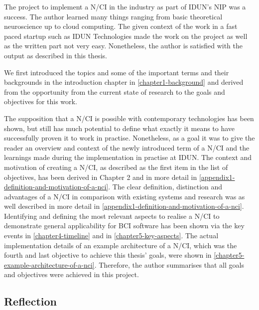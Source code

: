 The project to implement a N/CI in the industry as part of IDUN's NIP was a success. The author learned many things ranging from basic theoretical neuroscience up to cloud computing. The given context of the work in a fast paced startup such as IDUN Technologies made the work on the project as well as the written part not very easy. Nonetheless, the author is satisfied with the output as described in this thesis.

We first introduced the topics and some of the important terms and their backgrounds in the introduction chapter in \autoref{chapter1-background} and derived from the opportunity from the current state of research to the goals and objectives for this work.

The supposition that a N/CI is possible with contemporary technologies has been shown, but still has much potential to define what exactly it means to have successfully proven it to work in practise. Nonetheless, as a goal it was to give the reader an overview and context of the newly introduced term of a N/CI and the learnings made during the implementation in practise at IDUN. The context and motivation of creating a N/CI, as described as the first item in the list of objectives, has been derived in Chapter 2 and in more detail in \autoref{appendix1-definition-and-motivation-of-a-nci}. The clear definition, distinction and advantages of a N/CI in comparison with existing systems and research was as well described in more detail in \autoref{appendix1-definition-and-motivation-of-a-nci}. Identifying and defining the most relevant aspects to realise a N/CI to demonstrate general applicability for BCI software has been shown via the key events in \autoref{chapter4-timeline} and in \autoref{chapter5-key-aspects}. The actual implementation details of an example architecture of a N/CI, which was the fourth and last objective to achieve this thesis' goals, were shown in \autoref{chapter5-example-architecture-of-a-nci}. Therefore, the author summarises that all goals and objectives were achieved in this project.

\subsection{Reflection}
\label{chapter5-reflection}

